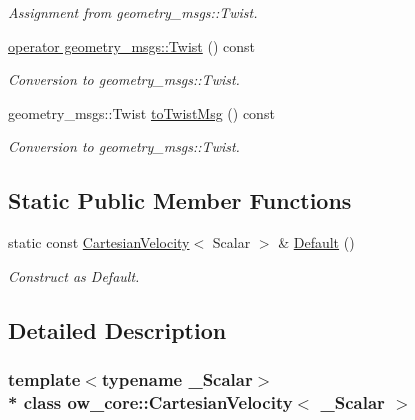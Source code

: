 \begin{DoxyCompactItemize}
\begin{DoxyCompactList}\small\item\em Assignment from geometry\+\_\+msgs\+::\+Twist. \end{DoxyCompactList}\item 
\hyperlink{classow__core_1_1CartesianVelocity_ad3566f959c904cf22a4f1228290f8c15}{operator geometry\+\_\+msgs\+::\+Twist} () const \hypertarget{classow__core_1_1CartesianVelocity_ad3566f959c904cf22a4f1228290f8c15}{}\label{classow__core_1_1CartesianVelocity_ad3566f959c904cf22a4f1228290f8c15}

\begin{DoxyCompactList}\small\item\em Conversion to geometry\+\_\+msgs\+::\+Twist. \end{DoxyCompactList}\item 
geometry\+\_\+msgs\+::\+Twist \hyperlink{classow__core_1_1CartesianVelocity_a554aac9c93626cd576444a4fead7ac7f}{to\+Twist\+Msg} () const \hypertarget{classow__core_1_1CartesianVelocity_a554aac9c93626cd576444a4fead7ac7f}{}\label{classow__core_1_1CartesianVelocity_a554aac9c93626cd576444a4fead7ac7f}

\begin{DoxyCompactList}\small\item\em Conversion to geometry\+\_\+msgs\+::\+Twist. \end{DoxyCompactList}\end{DoxyCompactItemize}
\subsection*{Static Public Member Functions}
\begin{DoxyCompactItemize}
\item 
static const \hyperlink{classow__core_1_1CartesianVelocity}{Cartesian\+Velocity}$<$ Scalar $>$ \& \hyperlink{classow__core_1_1CartesianVelocity_ab9823aafa0100aa054396668a32324c1}{Default} ()
\begin{DoxyCompactList}\small\item\em Construct as Default. \end{DoxyCompactList}\end{DoxyCompactItemize}


\subsection{Detailed Description}
\subsubsection*{template$<$typename \+\_\+\+Scalar$>$\\*
class ow\+\_\+core\+::\+Cartesian\+Velocity$<$ \+\_\+\+Scalar $>$}

